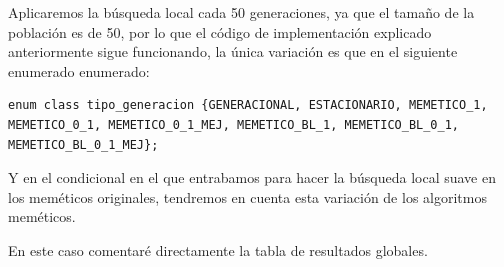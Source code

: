 \documentclass[12pt, spanish]{article}
\begin{document}
Aplicaremos la búsqueda local cada 50 generaciones, ya que el tamaño de la población es de 50, por lo que el código de implementación explicado anteriormente sigue funcionando, la única variación es que en el siguiente enumerado enumerado:

\begin{lstlisting}
enum class tipo_generacion {GENERACIONAL, ESTACIONARIO, MEMETICO_1, MEMETICO_0_1, MEMETICO_0_1_MEJ, MEMETICO_BL_1, MEMETICO_BL_0_1, MEMETICO_BL_0_1_MEJ};
\end{lstlisting}

Y en el condicional en el que entrabamos para hacer la búsqueda local suave en los meméticos originales, tendremos en cuenta esta variación de los algoritmos meméticos.

En este caso comentaré directamente la tabla de resultados globales.
\end{document}
